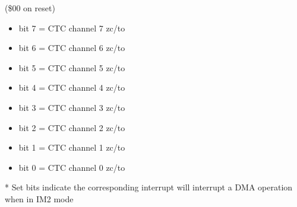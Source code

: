 (\$00 on reset)
\begin{itemize}
\item bit 7 = CTC channel 7 zc/to
\item bit 6 = CTC channel 6 zc/to
\item bit 5 = CTC channel 5 zc/to
\item bit 4 = CTC channel 4 zc/to
\item bit 3 = CTC channel 3 zc/to
\item bit 2 = CTC channel 2 zc/to
\item bit 1 = CTC channel 1 zc/to
\item bit 0 = CTC channel 0 zc/to
\end{itemize}
* Set bits indicate the corresponding interrupt will interrupt a DMA
  operation when in IM2 mode
